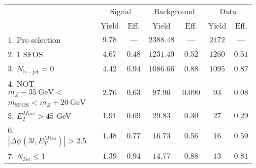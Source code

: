 \begin{tabular}{l||c|c||c|c||c|c}
\hline
 &                 \multicolumn{2}{c||}{Signal}            &  \multicolumn{2}{c||}{Background} &  \multicolumn{2}{c}{Data} \\
   & Yield & Eff. & Yield & Eff. & Yield & Eff.\\
   \hline\hline
   1. Pre-selection &  $9.78$ & --- &  $2388.48$ & --- & $2472$ &  --- \\
   \hline
   2. 1 SFOS &  $4.67$ &  $0.48$ &  $1231.49$ &  $0.52$ & $1260$ &  $0.51$ \\ 
   \hline
   3. $N_{\mathrm{b-jet}} = 0$ &  $4.42$ &  $0.94$ &  $1086.66$ &  $0.88$ & $1095$ &  $0.87$\\ 
   \hline
   4. NOT $m_Z - 35~\mathrm{GeV} <$  &  \multirow{2}{*}{$2.76$} &  \multirow{2}{*}{$0.63$} &  \multirow{2}{*}{$97.96$} &  \multirow{2}{*}{$0.090$} & \multirow{2}{*}{$93$} &  \multirow{2}{*}{$0.08$}\\ 
   $ m_{\mathrm{SFOS}} < m_Z + 20~\mathrm{GeV}$  & & & & &  & \\
   \hline
   5. $E_{T}^{Miss} > 45$ GeV &  $1.91$ &  $0.69$ &  $29.83$ &  $0.30$ & $27$ &  $0.29$\\ 
   \hline
   6. $|\Delta\phi(3l,E_{T}^{Miss})| > 2.5$ &  $1.48$ &  $0.77$ &  $16.73$ &  $0.56$ & $16$ &  $0.59$\\ 
   \hline
   7. $N_{\mathrm{Jet}} \leq 1$ &  $1.39$ &  $0.94$ &  $14.77$ &  $0.88$ & $13$ &  $0.81$\\ 
   \hline
   \end{tabular}
